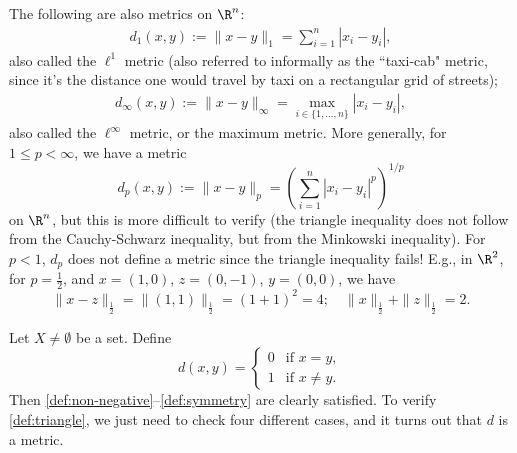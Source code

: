 \begin{example}
The following are also metrics on $\R^n$:
\begin{align*}
d_1(x,y):= \|x-y\|_1 = \sum_{i = 1}^n |x_i - y_i|,
\end{align*}
also called the $\ell^1$ metric (also referred to informally as the ``taxi-cab" metric, since it's the distance one would travel by taxi on a rectangular grid of streets);
\begin{align*}
d_\infty(x,y):= \|x-y\|_\infty = \max_{i \in \{1,\ldots,n\}} |x_i - y_i|,
\end{align*}
also called the $\ell^\infty$ metric, or the maximum metric.
More generally, for $1 \le p < \infty$, we have a metric
\[
d_p(x,y):= \|x-y\|_p = \left(\sum_{i = 1}^n |x_i - y_i|^p\right)^{1/p}
\]
on $\R^n$, but this is more difficult to verify (the triangle inequality does not follow from the Cauchy-Schwarz inequality, but from the Minkowski inequality). 
For $p < 1$, $d_p$ does not define a metric since the triangle inequality fails! E.g., in $\R^2$, for $p=\frac12$, and $x=(1,0)$, $z=(0,-1)$, $y=(0,0)$, we have 
$$
\|x-z\|_{\frac12} = \|(1,1)\|_{\frac12} = (1+1)^2 = 4; \quad \|x\|_{\frac12} + \|z\|_{\frac12} = 2.
$$
\end{example}

\np

\begin{example} \label{discrete-metric}
Let $X \not= \emptyset$ be a set. Define 
$$
d(x,y) = \begin{cases} 
0 & \text{if } x=y, \\ 
1 & \text{if } x\neq y. 
\end{cases}
$$
Then \eqref{def:non-negative}--\eqref{def:symmetry} are clearly satisfied. To
verify \eqref{def:triangle}, we just need to check four different cases, and it turns
out that $d$ is a metric.
\end{example}

